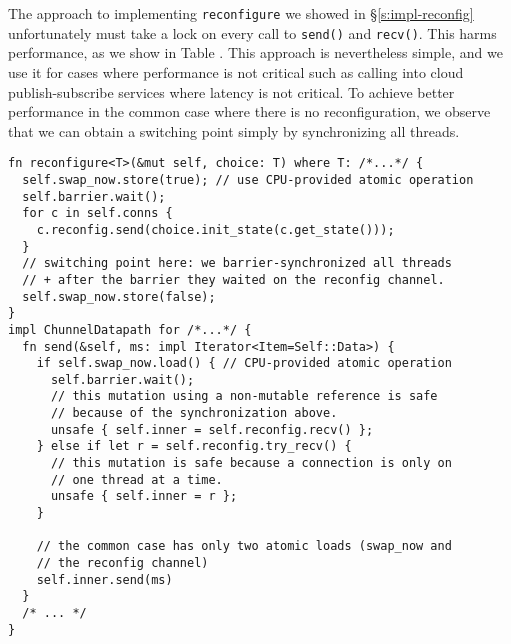 \begin{outline}
\1 The approach to implementing \texttt{reconfigure} we showed in \S\ref{s:impl-reconfig} unfortunately must take a lock on every call to \texttt{send()} and \texttt{recv()}. This harms performance, as we show in Table .
  \2 This approach is nevertheless simple, and we use it for cases where performance is not critical such as \tunnels calling into cloud publish-subscribe services where latency is not critical.
\1 To achieve better performance in the common case where there is no reconfiguration, we observe that we can obtain a switching point simply by synchronizing all threads.
\begin{verbatim}
fn reconfigure<T>(&mut self, choice: T) where T: /*...*/ {
  self.swap_now.store(true); // use CPU-provided atomic operation
  self.barrier.wait();
  for c in self.conns {
    c.reconfig.send(choice.init_state(c.get_state()));
  }
  // switching point here: we barrier-synchronized all threads 
  // + after the barrier they waited on the reconfig channel.
  self.swap_now.store(false);
}
impl ChunnelDatapath for /*...*/ {
  fn send(&self, ms: impl Iterator<Item=Self::Data>) { 
    if self.swap_now.load() { // CPU-provided atomic operation 
      self.barrier.wait();
      // this mutation using a non-mutable reference is safe 
      // because of the synchronization above.
      unsafe { self.inner = self.reconfig.recv() };
    } else if let r = self.reconfig.try_recv() {
      // this mutation is safe because a connection is only on 
      // one thread at a time.
      unsafe { self.inner = r };
    }
    
    // the common case has only two atomic loads (swap_now and 
    // the reconfig channel)
    self.inner.send(ms)
  }
  /* ... */
}
\end{verbatim}
\end{outline}



